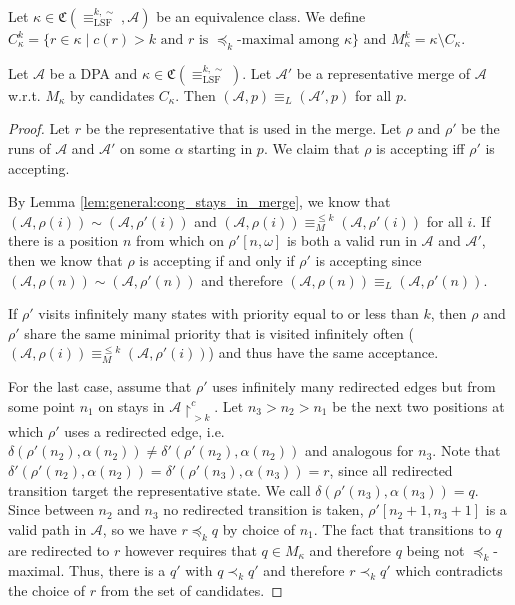 \begin{defn}
	Let $\kappa \in \mathfrak{C}(\equiv_\text{LSF}^{k,\sim}, \mathcal{A})$ be an equivalence class. We define $C_\kappa^k = \{ r \in \kappa \mid c(r) > k \text{ and } r \text{ is } \preceq_k \text{-maximal among } \kappa \}$ and $M^k_\kappa = \kappa \setminus C_\kappa$.
\end{defn}


\vspace{5pt}

\begin{lem}
	Let $\mathcal{A}$ be a DPA and $\kappa \in \mathfrak{C}(\equiv_\text{LSF}^{k,\sim})$. Let $\mathcal{A}'$ be a representative merge of $\mathcal{A}$ w.r.t. $M_\kappa$ by candidates $C_\kappa$. Then $(\mathcal{A}, p) \equiv_L (\mathcal{A}', p)$ for all $p$.
	\label{lem:lsf:preserve_language}
\end{lem}

\begin{proof}
	Let $r$ be the representative that is used in the merge. Let $\rho$ and $\rho'$ be the runs of $\mathcal{A}$ and $\mathcal{A}'$ on some $\alpha$ starting in $p$. We claim that $\rho$ is accepting iff $\rho'$ is accepting.
	
	By Lemma \ref{lem:general:cong_stays_in_merge}, we know that $(\mathcal{A}, \rho(i)) \sim (\mathcal{A}, \rho'(i))$ and $(\mathcal{A}, \rho(i)) \equiv_M^{\leq k} (\mathcal{A}, \rho'(i))$ for all $i$. If there is a position $n$ from which on $\rho'[n,\omega]$ is both a valid run in $\mathcal{A}$ and $\mathcal{A}'$, then we know that $\rho$ is accepting if and only if $\rho'$ is accepting since $(\mathcal{A}, \rho(n)) \sim (\mathcal{A}, \rho'(n))$ and therefore $(\mathcal{A}, \rho(n)) \equiv_L (\mathcal{A}, \rho'(n))$.
	
	If $\rho'$ visits infinitely many states with priority equal to or less than $k$, then $\rho$ and $\rho'$ share the same minimal priority that is visited infinitely often ($(\mathcal{A}, \rho(i)) \equiv_M^{\leq k} (\mathcal{A}, \rho'(i))$) and thus have the same acceptance.
	
	For the last case, assume that $\rho'$ uses infinitely many redirected edges but from some point $n_1$ on stays in $\mathcal{A}\upharpoonright^c_{>k}$. Let $n_3 > n_2 > n_1$ be the next two positions at which $\rho'$ uses a redirected edge, i.e. $\delta(\rho'(n_2), \alpha(n_2)) \neq \delta'(\rho'(n_2), \alpha(n_2))$ and analogous for $n_3$. Note that $\delta'(\rho'(n_2), \alpha(n_2)) = \delta'(\rho'(n_3), \alpha(n_3)) = r$, since all redirected transition target the representative state. We call $\delta(\rho'(n_3), \alpha(n_3)) = q$. Since between $n_2$ and $n_3$ no redirected transition is taken, $\rho'[n_2 + 1, n_3 + 1]$ is a valid path in $\mathcal{A}$, so we have $r \preceq_k q$ by choice of $n_1$. The fact that transitions to $q$ are redirected to $r$ however requires that $q \in M_\kappa$ and therefore $q$ being not $\preceq_k$-maximal. Thus, there is a $q'$ with $q \prec_k q'$ and therefore $r \prec_k q'$ which contradicts the choice of $r$ from the set of candidates.
\end{proof}

